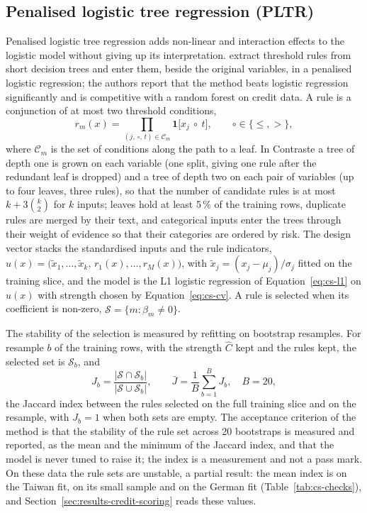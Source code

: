 \subsection{Penalised logistic tree regression (PLTR)}
\label{sec:m3}

Penalised logistic tree regression adds non-linear and interaction effects to the logistic model without giving up its
interpretation. \citet{credit-scoring:dumitrescu2022} extract threshold rules from short decision trees and enter them, beside the
original variables, in a penalised logistic regression; the authors report that the method beats logistic regression significantly
and is competitive with a random forest on credit data. A rule is a conjunction of at most two threshold conditions,
\begin{equation}
r_m(x)=\prod_{(j,\,\circ,\,t)\in\mathcal{C}_m}\mathbf 1\big[x_j\ \circ\ t\big],\qquad \circ\in\{\le,>\},
\label{eq:cs-rule}
\end{equation}
where $\mathcal{C}_m$ is the set of conditions along the path to a leaf. In Contraste a tree of depth one is grown on each variable
(one split, giving one rule after the redundant leaf is dropped) and a tree of depth two on each pair of variables (up to four
leaves, three rules), so that the number of candidate rules is at most $k+3\binom{k}{2}$ for $k$ inputs; leaves hold at least 5\,\%
of the training rows, duplicate rules are merged by their text, and categorical inputs enter the trees through their weight of
evidence so that their categories are ordered by risk. The design vector stacks the standardised inputs and the rule indicators,
$u(x)=\big(\tilde x_1,\dots,\tilde x_k,\,r_1(x),\dots,r_M(x)\big)$, with $\tilde x_j=(x_j-\mu_j)/\sigma_j$ fitted on the training
slice, and the model is the L1 logistic regression of Equation~\eqref{eq:cs-l1} on $u(x)$ with strength chosen by
Equation~\eqref{eq:cs-cv}. A rule is selected when its coefficient is non-zero, $\mathcal{S}=\{m:\hat\beta_m\neq0\}$.

The stability of the selection is measured by refitting on bootstrap resamples. For resample $b$ of the training rows, with the
strength $\hat C$ kept and the rules kept, the selected set is $\mathcal{S}_b$, and
\begin{equation}
J_b=\frac{|\mathcal{S}\cap\mathcal{S}_b|}{|\mathcal{S}\cup\mathcal{S}_b|},\qquad
\bar J=\frac1B\sum_{b=1}^{B}J_b,\quad B=20,
\label{eq:cs-jaccard}
\end{equation}
the Jaccard index between the rules selected on the full training slice and on the resample, with $J_b=1$ when both sets are
empty. The acceptance criterion of the method is that the stability of the rule set across 20 bootstraps is measured and reported, as the mean and the minimum of
the Jaccard index, and that the model is never tuned to raise it; the index is a measurement and not a pass mark. On these data the rule sets are unstable, a partial result: the mean index is \csFitTwPlJm{} on the Taiwan fit,
\csFitSmPlJm{} on its small sample and \csFitGePlJm{} on the German fit (Table~\ref{tab:cs-checks}), and Section~\ref{sec:results-credit-scoring} reads these values.

